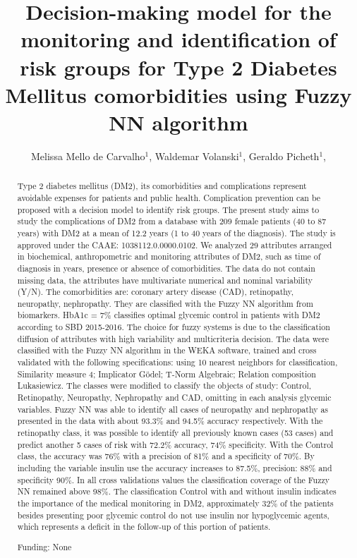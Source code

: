 \documentclass[twoside]{article}
\title{\vspace{-15mm}\fontsize{24pt}{10pt}\selectfont\textbf{ Decision-making model for the monitoring and identification of risk groups for Type 2 Diabetes Mellitus comorbidities using Fuzzy NN algorithm }} %
\author{ Melissa Mello de Carvalho$^{1}$, Waldemar Volanski$^{1}$, Geraldo Picheth$^{1}$, }
\affil{ 1 UFPR

 }
\date{}
\begin{document}
  
  
  \maketitle %
  
  
  \thispagestyle{fancy} %
  
  
  \begin{abstract}
  Type 2 diabetes mellitus (DM2), its comorbidities and complications represent avoidable expenses for patients and public health. Complication prevention can be proposed with a decision model to identify risk groups. The present study aims to study the complications of DM2 from a database with 209 female patients (40 to 87 years) with DM2 at a mean of 12.2 years (1 to 40 years of the diagnosis). The study is approved under the CAAE: 1038112.0.0000.0102. We analyzed 29 attributes arranged in biochemical, anthropometric and monitoring attributes of DM2, such as time of diagnosis in years, presence or absence of comorbidities. The data do not contain missing data, the attributes have multivariate numerical and nominal variability (Y/N). The comorbidities are: coronary artery disease (CAD), retinopathy, neuropathy, nephropathy. They are classified with the Fuzzy NN algorithm from biomarkers. HbA1c = 7\% classifies optimal glycemic control in patients with DM2 according to SBD 2015-2016. The choice for fuzzy systems is due to the classification diffusion of attributes with high variability and multicriteria decision. The data were classified with the Fuzzy NN algorithm in the WEKA software, trained and cross validated with the following specifications: using 10 nearest neighbors for classification, Similarity measure 4; Implicator G\"odel; T-Norm Algebraic; Relation composition Lukasiewicz. The classes were modified to classify the objects of study: Control, Retinopathy, Neuropathy, Nephropathy and CAD, omitting in each analysis glycemic variables. Fuzzy NN was able to identify all cases of neuropathy and nephropathy as presented in the data with about 93.3\% and 94.5\% accuracy respectively. With the retinopathy class, it was possible to identify all previously known cases (53 cases) and predict another 5 cases of risk with 72.2\% accuracy, 74\% specificity. With the Control class, the accuracy was 76\% with a precision of 81\% and a specificity of 70\%. By including the variable insulin use the accuracy increases to 87.5\%, precision: 88\% and specificity 90\%. In all cross validations values the classification coverage of the Fuzzy NN remained above 98\%. The classification Control with and without insulin indicates the importance of the medical monitoring in DM2, approximately 32\% of the patients besides presenting poor glycemic control do not use insulin nor hypoglycemic agents, which represents a deficit in the follow-up of this portion of patients.
  
  Funding: None \\ 
  \end{abstract}
  
\end{document}
